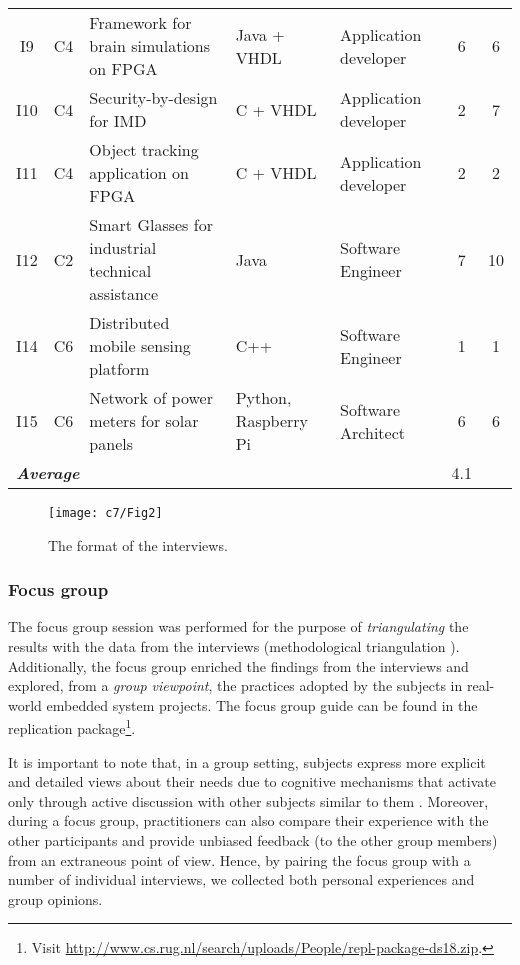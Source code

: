 \begin{table}[tbp]
\begin{tabular}{@{}cc>{\centering\arraybackslash}m{2.5cm}>{\centering\arraybackslash}m{1.5cm}>{\centering\arraybackslash}m{1.5cm}cc@{}}
        I9 & C4 & Framework for brain simulations on FPGA & Java + VHDL & Application developer & 6 & 6 \\
        I10 & C4 & Security-by-design for IMD & C + VHDL & Application developer & 2 & 7 \\
        I11 & C4 & Object tracking application on FPGA & C + VHDL & Application developer & 2 & 2 \\
        I12 & C2 & Smart Glasses for industrial technical assistance & Java & Software Engineer & 7 & 10 \\
        I14 & C6 & Distributed mobile sensing platform & C++ & Software Engineer & 1 & 1 \\
        I15 & C6 & Network of power meters for solar panels & Python, Raspberry Pi & Software Architect & 6 & 6 \\
        \midrule\midrule
    \multicolumn{5}{l}{\textit{\textbf{Average}}} & 4.1 & 7.3 \\ \bottomrule
    \end{tabular}
\end{table}
\begin{figure}
    \centering
    \texttt{[image: c7/Fig2]}
    \caption{The format of the interviews.}\label{c7:fig:interview-phases}
\end{figure}

\subsubsection{Focus group}
The focus group session was performed for the purpose of \emph{triangulating} the results with the data from the interviews (methodological triangulation \cite{Runeson2012}).
Additionally, the focus group enriched the findings from the interviews and explored, from a \emph{group viewpoint}, the practices adopted by the subjects in real-world embedded system projects.
The focus group guide can be found in the replication package\footnote{Visit \url{http://www.cs.rug.nl/search/uploads/People/repl-package-ds18.zip}. }.

It is important to note that, in a group setting, subjects express more explicit and detailed views about their needs due to cognitive mechanisms that activate only through active discussion with other subjects similar to them \cite{Mcdonagh2000,Kontio2008}. Moreover, during a focus group, practitioners can also compare their experience with the other participants and provide unbiased feedback (to the other group members) from an extraneous point of view.
Hence, by pairing the focus group with a number of individual interviews, we collected both personal experiences and group opinions. 

